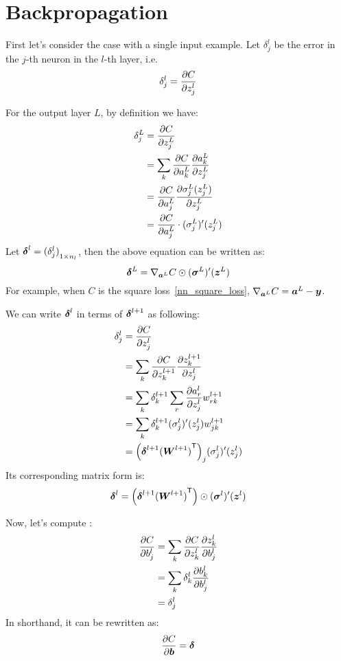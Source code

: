 \section{Backpropagation}
First let's consider the case with a single input example. Let $\delta^l_j$ be the error in the $j$-th neuron
in the $l$-th layer, i.e.
\begin{equation}\label{delta_l_j}
    \delta^l_j = \frac{\partial {C}}{\partial {z^l_j}}
\end{equation}

For the output layer $L$, by definition we have:
\begin{align*}
    \delta^L_j &= \frac{\partial {C}}{\partial {z^L_j}}\\
               &= \sum_k \frac{\partial {C}}{\partial {a^L_k}} \frac{\partial {a^L_k}}{\partial {z^L_j}}\\
               &= \frac{\partial {C}}{\partial {a^L_j}} \frac{\partial {\sigma^L_j(z^L_j)}}{\partial {z^L_j}}\\
               &= \frac{\partial {C}}{\partial {a^L_j}}\cdot (\sigma^L_j)'(z^L_j)
\end{align*}
Let $\boldsymbol{\delta}^l = {(\delta^l_j)}_{1 \times n_l}$, then the above equation can be written as:
\begin{equation}
    \boldsymbol{\delta}^L = \nabla_{\boldsymbol{a}^L}C \odot (\boldsymbol{\sigma}^L)'(\boldsymbol{z}^L)
\end{equation}
For example, when $C$ is the square loss~\eqref{nn_square_loss}, $\nabla_{\boldsymbol{a}^L}C = \boldsymbol{a}^L - \boldsymbol{y}$.
\par
We can write $\boldsymbol{\delta}^l$ in terms of $\boldsymbol{\delta}^{l+1}$ as following:
\begin{align*}
    \delta^l_j &= \frac{\partial {C}}{\partial {z^l_j}}\\
               &= \sum_k \frac{\partial {C}}{\partial {z^{l+1}_k}} \frac{\partial {z^{l+1}_k}}{\partial {z^l_j}}\\
               &= \sum_k \delta^{l+1}_k \sum_r \frac{\partial {a^l_r}}{\partial {z^l_j}} w^{l+1}_{rk}\\
               &= \sum_k \delta^{l+1}_k (\sigma^l_j)'(z^l_j) w^{l+1}_{jk}\\
               &= {\left(\boldsymbol{\delta}^{l+1} {(\boldsymbol{W}^{l+1})}^\mathsf{T}\right)}_{j} (\sigma^l_j)'(z^l_j)
\end{align*}
Its corresponding matrix form is:
\begin{equation}
    \boldsymbol{\delta}^l = \left(\boldsymbol{\delta}^{l+1} {(\boldsymbol{W}^{l+1})}^\mathsf{T}\right) \odot (\boldsymbol{\sigma}^l)'(\boldsymbol{z}^l)
\end{equation}

Now, let's compute :
\begin{align*}
    \frac{\partial {C}}{\partial {b^l_j}} &= \sum_k \frac{\partial {C}}{\partial {z^l_k}} \frac{\partial {z^l_k}}{\partial {b^l_j}}\\
                     &= \sum_k \delta^l_k \frac{\partial {b^l_k}}{\partial {b^l_j}}\\
                     &= \delta^l_j
\end{align*}
In shorthand, it can be rewritten as:
\begin{equation}
    \frac{\partial {C}}{\partial {\ensuremath{\boldsymbol{b}}}} = \boldsymbol{\delta}
\end{equation}

